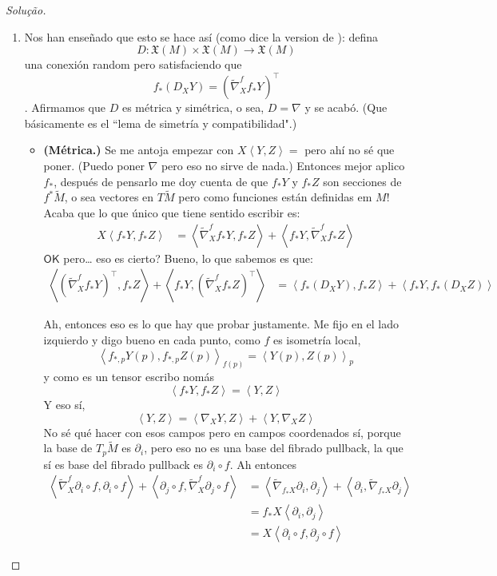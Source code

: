 \begin{proof}[Solução]\leavevmode
\begin{enumerate}[label=(\alph*)]
\item Nos han enseñado que esto se hace así (como dice la version de \cite{daj}): defina
	\[D: \mathfrak{X}(M)\times \mathfrak{X}(M) \longrightarrow \mathfrak{X}(M)\]
una conexión random pero satisfaciendo que
\[f_*(D_XY) = \left(\widetilde{\nabla}_X^f f_*Y\right)^\top\]
. Afirmamos que \(D\) es métrica y simétrica, o sea, \(D=\nabla\) y se acabó. (Que básicamente es el ``lema de simetría y compatibilidad".)
\begin{itemize}
\item \textbf{(Métrica.)} Se me antoja empezar con \(X\left<Y,Z\right>=\) pero ahí no sé que poner. (Puedo poner \(\nabla\) pero eso no sirve de nada.) Entonces mejor aplico \(f_*\), después de pensarlo me doy cuenta de que \(f_*Y\) y \(f_*Z\) son secciones de \(f^*\widetilde{M}\), o sea vectores en \(T\widetilde{M}\) pero como funciones están definidas em \(M\)! Acaba que lo que único que tiene sentido escribir es:
\begin{align*}
X\left<f_*Y,f_*Z\right>&=\left<\widetilde{\nabla}^f_Xf_*Y,f_*Z\right>+\left<f_*Y,\widetilde{\nabla}^f_Xf_*Z\right>
\end{align*}
\(\mathsf{OK}\) pero… eso es cierto? Bueno, lo que sabemos es que:
\begin{align*}
\left<\left( \widetilde{\nabla}^f_Xf_*Y\right)^\top,f_*Z\right>+\left<f_*Y,\left(\widetilde{\nabla}^f_Xf_*Z\right)^\top\right>&=\left<f_*(D_XY),f_*Z\right>+\left<f_*Y,f_*(D_XZ)\right>
\end{align*}



Ah, entonces eso es lo que hay que probar justamente. Me fijo en el lado izquierdo y digo bueno en cada punto, como \(f\) es isometría local,
\[\left<f_{*,p}Y(p),f_{*,p}Z(p)\right>_{f(p)}=\left<Y(p),Z(p)\right>_{p}\]
y como es un tensor escribo nomás
\[\left<f_*Y,f_*Z\right>=\left<Y,Z\right>\]
Y eso sí,
\[\left<Y,Z\right>=\left<\nabla_XY,Z\right>+\left<Y,\nabla_XZ\right>\]
No sé qué hacer con esos campos pero en campos coordenados sí, porque la base de  \(T_p\widetilde{M}\) es \(\partial_i\), pero eso no es una base del fibrado pullback, la que sí es base del fibrado pullback es \(\partial_i \circ f\). Ah entonces
\begin{align*}
\left<\widetilde{\nabla}_X^f \partial_i \circ f,\partial_i \circ f\right>+\left<\partial_j \circ f,\widetilde{\nabla}_X^f \partial_j \circ f\right>&= \left<\tilde{\nabla}_{f_*X}\partial_i,\partial_j\right>+\left<\partial_i,\widetilde{\nabla}_{f_* X}\partial_j\right>\\
&=f_*X\left<\partial_i, \partial_j\right>\\
&=X\left<\partial_i \circ f,\partial_j \circ f\right>
\end{align*}
\end{itemize}

\end{enumerate}
\end{proof}





